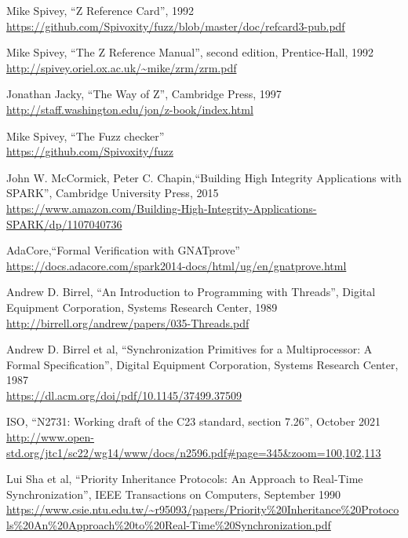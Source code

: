 \documentclass[11pt,letterpaper,twoside,openany]{book}
\begin{document}
\begin{thebibliography}{9}

Mike Spivey, ``Z Reference Card'', 1992 \\
\url{https://github.com/Spivoxity/fuzz/blob/master/doc/refcard3-pub.pdf}

Mike Spivey, ``The Z Reference Manual'', second edition, Prentice-Hall, 1992 \\
\url{http://spivey.oriel.ox.ac.uk/~mike/zrm/zrm.pdf}

Jonathan Jacky, ``The Way of Z'', Cambridge Press, 1997 \\
\url{http://staff.washington.edu/jon/z-book/index.html}

Mike Spivey, ``The Fuzz checker'' \\
\url{https://github.com/Spivoxity/fuzz}

John W. McCormick, Peter C. Chapin,``Building High Integrity Applications with SPARK'', Cambridge University Press, 2015 \\
\url{https://www.amazon.com/Building-High-Integrity-Applications-SPARK/dp/1107040736}

AdaCore,``Formal Verification with GNATprove'' \\
\url{https://docs.adacore.com/spark2014-docs/html/ug/en/gnatprove.html}

Andrew D. Birrel, ``An Introduction to Programming with Threads'',
Digital Equipment Corporation, Systems Research Center, 1989 \\
\url{http://birrell.org/andrew/papers/035-Threads.pdf}

Andrew D. Birrel et al, ``Synchronization Primitives for a Multiprocessor: A Formal Specification'',
Digital Equipment Corporation, Systems Research Center, 1987 \\
\url{https://dl.acm.org/doi/pdf/10.1145/37499.37509}

ISO, ``N2731: Working draft of the C23 standard, section 7.26'', October 2021 \\
\url{http://www.open-std.org/jtc1/sc22/wg14/www/docs/n2596.pdf#page=345&zoom=100,102,113}

Lui Sha et al, ``Priority Inheritance Protocols: An Approach to Real-Time Synchronization'', IEEE Transactions on Computers, September 1990 \\
\url{https://www.csie.ntu.edu.tw/~r95093/papers/Priority%20Inheritance%20Protocols%20An%20Approach%20to%20Real-Time%20Synchronization.pdf}


\end{thebibliography}
\end{document}
